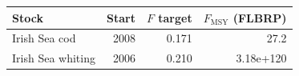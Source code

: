 \begin{tabular}{@{}lrrr@{}}
\toprule
Stock & Start & $F$ target & $F_{\mathrm{MSY}}$ (FLBRP) \\
\midrule
Irish Sea cod & 2008 & 0.171 & 27.2 \\
Irish Sea whiting & 2006 & 0.210 & 3.18e+120 \\
\bottomrule
\end{tabular}
